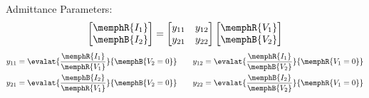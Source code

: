 \begin{multicols}{2}
\begin{CheatsheetEntryFrameStart}
        Admittance Parameters:
        \begin{equation*}
            \begin{bmatrix}
                \memphR{I_1} \\
                \memphB{I_2}
            \end{bmatrix}
            =
            \begin{bmatrix}
                y_{11} & y_{12} \\
                y_{21} & y_{22}
            \end{bmatrix}
            \begin{bmatrix}
                \memphR{V_1} \\
                \memphB{V_2}
            \end{bmatrix}
        \end{equation*}
        \begin{align*}
            y_{11} &= \evalat{\frac{\memphR{I_1}}{\memphR{V_1}}}{\memphB{V_2 = 0}} \quad &
            y_{12} &= \evalat{\frac{\memphR{I_1}}{\memphB{V_2}}}{\memphR{V_1 = 0}} \\
            y_{21} &= \evalat{\frac{\memphB{I_2}}{\memphR{V_1}}}{\memphB{V_2 = 0}} \quad &
            y_{22} &= \evalat{\frac{\memphB{I_2}}{\memphB{V_2}}}{\memphR{V_1 = 0}}
        \end{align*}


\end{CheatsheetEntryFrameStart}
\end{multicols}
